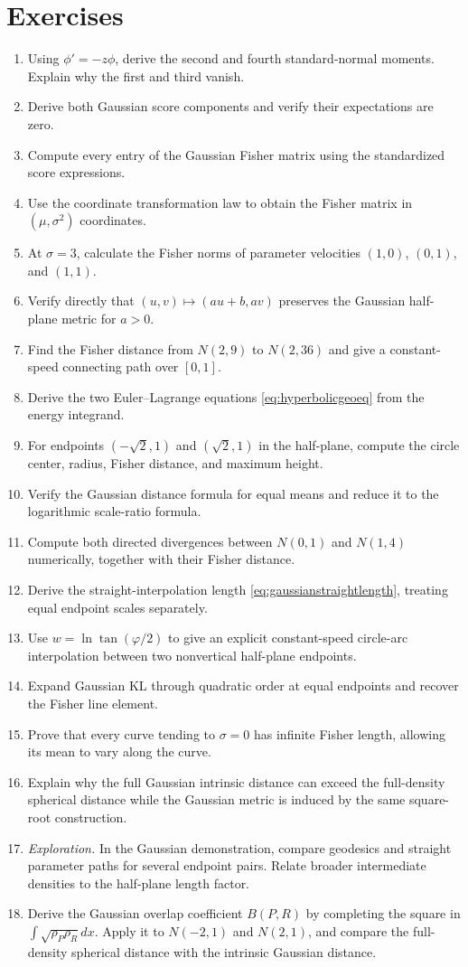 \documentclass[11pt,oneside,openany]{book}
\theoremstyle{definition}
\theoremstyle{remark}
\newenvironment{exercises}{\begin{enumerate}[label=\thechapter.\arabic*,ref=\thechapter.\arabic*,leftmargin=2.8em,itemsep=6pt]}{\end{enumerate}}
\numberwithin{equation}{chapter}
\begin{document}
\FloatBarrier
\section{Exercises}
\begin{exercises}
\item Using $\phi'=-z\phi$, derive the second and fourth standard-normal moments. Explain why the first and third vanish.
\item Derive both Gaussian score components and verify their expectations are zero.
\item Compute every entry of the Gaussian Fisher matrix using the standardized score expressions.
\item Use the coordinate transformation law to obtain the Fisher matrix in $(\mu,\sigma^2)$ coordinates.
\item At $\sigma=3$, calculate the Fisher norms of parameter velocities $(1,0)$, $(0,1)$, and $(1,1)$.
\item Verify directly that $(u,v)\mapsto(au+b,av)$ preserves the Gaussian half-plane metric for $a>0$.
\item Find the Fisher distance from $N(2,9)$ to $N(2,36)$ and give a constant-speed connecting path over $[0,1]$.
\item Derive the two Euler--Lagrange equations \eqref{eq:hyperbolicgeoeq} from the energy integrand.
\item For endpoints $(-\sqrt2,1)$ and $(\sqrt2,1)$ in the half-plane, compute the circle center, radius, Fisher distance, and maximum height.
\item Verify the Gaussian distance formula for equal means and reduce it to the logarithmic scale-ratio formula.
\item Compute both directed divergences between $N(0,1)$ and $N(1,4)$ numerically, together with their Fisher distance.
\item Derive the straight-interpolation length \eqref{eq:gaussianstraightlength}, treating equal endpoint scales separately.
\item Use $w=\ln\tan(\varphi/2)$ to give an explicit constant-speed circle-arc interpolation between two nonvertical half-plane endpoints.
\item Expand Gaussian KL through quadratic order at equal endpoints and recover the Fisher line element.
\item Prove that every curve tending to $\sigma=0$ has infinite Fisher length, allowing its mean to vary along the curve.
\item Explain why the full Gaussian intrinsic distance can exceed the full-density spherical distance while the Gaussian metric is induced by the same square-root construction.
\item \emph{Exploration.} In the Gaussian demonstration, compare geodesics and straight parameter paths for several endpoint pairs. Relate broader intermediate densities to the half-plane length factor.
\item Derive the Gaussian overlap coefficient $B(P,R)$ by completing the square in $\int\sqrt{\rho_P\rho_R}dx$. Apply it to $N(-2,1)$ and $N(2,1)$, and compare the full-density spherical distance with the intrinsic Gaussian distance.
\end{exercises}
\end{document}
